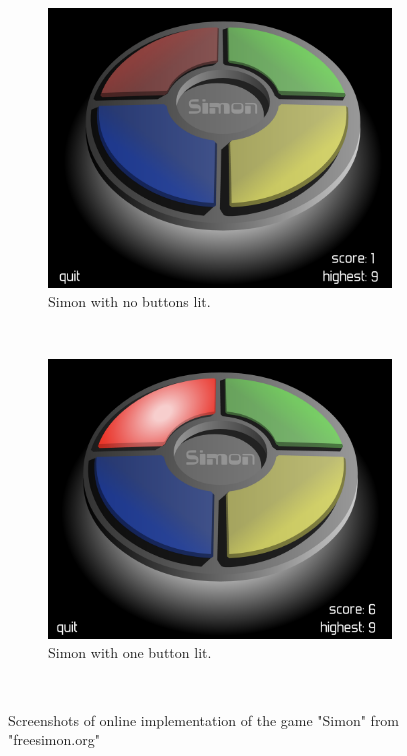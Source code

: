 \documentclass{l4proj}
\begin{document}


\begin{figure}[h!] %
  \centering

  \begin{subfigure}[b]{0.45\textwidth}
    \includegraphics[width=\textwidth]{dissertation/images/simon_before.png}
    \caption{Simon with no buttons lit.}
    \label{fig:simon_no_lights}
  \end{subfigure}
  ~ 
  \begin{subfigure}[b]{0.45\textwidth}
    \includegraphics[width=\textwidth]{dissertation/images/simon_during.png}
    \caption{Simon with one button lit.}
    \label{fig:simon_lit}
  \end{subfigure}
  ~  
  \caption{Screenshots of online implementation of the game "Simon" from "freesimon.org"}
  \label{fig:simon}  
\end{figure}
\end{document}
